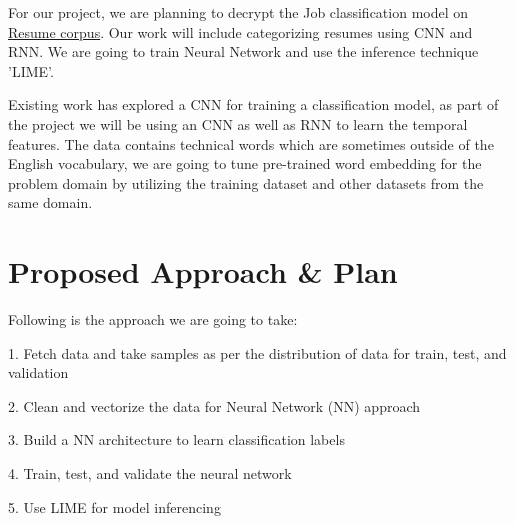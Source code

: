 \documentclass[11pt,letterpaper]{article}
\begin{document}
For our project, we are planning to decrypt the Job classification model on \href{https://github.com/florex/resume_corpus/blob/master/resumes_corpus.zip}{Resume corpus}. Our work will include categorizing resumes using CNN and RNN. We are going to train Neural Network and use the inference technique 'LIME'. 


Existing work has explored a CNN for training a classification model, as part of the project we will be using an CNN as well as RNN to learn the temporal features. The data contains technical words which are sometimes outside of the English vocabulary, we are going to tune pre-trained word embedding for the problem domain by utilizing the training dataset and other datasets from the same domain.




\section{Proposed Approach \& Plan}




Following is the approach we are going to take:


1. Fetch data and take samples as per the distribution of data for train, test, and validation

2. Clean and vectorize the data for Neural Network (NN) approach

3. Build a NN architecture to learn classification labels

4. Train, test, and validate the neural network

5. Use LIME for model inferencing
\end{document}
